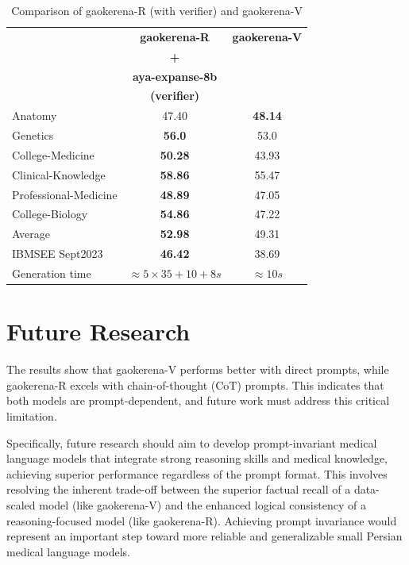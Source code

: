 \documentclass[conference]{IEEEtran}
\begin{document}
	\begin{table}[ht]
		\centering
		\caption{Comparison of gaokerena-R (with verifier) and gaokerena-V}
		\begin{tabular}{|l|c|c|}  
			\hline
			\textbf{} & \textbf{gaokerena-R} & \textbf{gaokerena-V}  \\ 
			& \textbf{+} &   \\
			& \textbf{ aya-expanse-8b}  &     \\ 
                        & \textbf{(verifier)}  &     \\ \hline
			Anatomy  & 47.40  & \textbf{48.14}   \\ \hline
			Genetics & \textbf{56.0}  & 53.0   \\ \hline
			College-Medicine & \textbf{50.28} & 43.93    \\ \hline
			Clinical-Knowledge & \textbf{58.86}  & 55.47  \\ \hline
			Professional-Medicine& \textbf{48.89} & 47.05  \\  \hline
			College-Biology& \textbf{54.86} & 47.22   \\ \hline
			Average & \textbf{52.98}  & 49.31   \\ \hline
			IBMSEE Sept2023 & \textbf{46.42}  &38.69   \\ \hline
			Generation time & $\approx 5 \times 35 + 10 + 8 s$ & $\approx 10s$  \\  \hline
		\end{tabular}
		\label{tab:med_opns_comparison}
	\end{table}
        
\section{Future Research}
The results show that gaokerena-V performs better with direct prompts, while gaokerena-R excels with chain-of-thought (CoT) prompts.  
This indicates that both models are prompt-dependent, and future work must address this critical limitation.

Specifically, future research should aim to develop prompt-invariant medical language models that integrate strong reasoning skills and medical knowledge, achieving superior performance regardless of the prompt format. This involves resolving the inherent trade-off between the superior factual recall of a data-scaled model (like gaokerena-V) and the enhanced logical consistency of a reasoning-focused model (like gaokerena-R). Achieving prompt invariance would represent an important step toward more reliable and generalizable small Persian medical language models.
\end{document}
